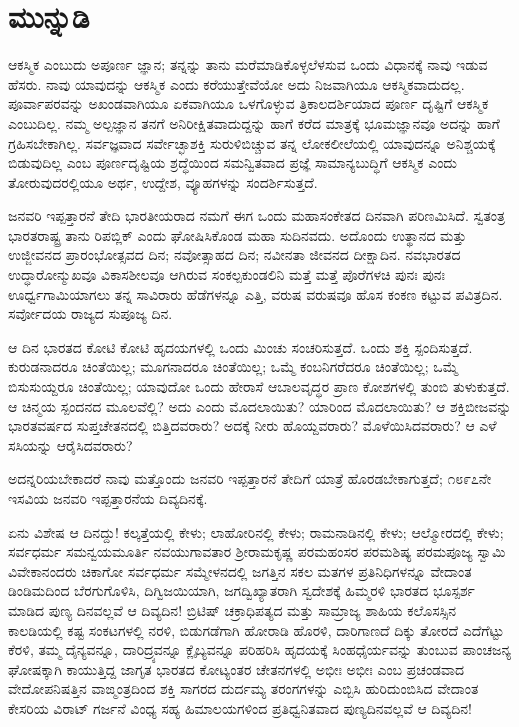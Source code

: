 
\chapter*{ಮುನ್ನುಡಿ}

ಆಕಸ್ಮಿಕ ಎಂಬುದು ಅಪೂರ್ಣ ಜ್ಞಾನ; ತನ್ನನ್ನು ತಾನು ಮರೆಮಾಡಿಕೊಳ್ಳಲೆಳಸುವ ಒಂದು ವಿಧಾನಕ್ಕೆ ನಾವು ಇಡುವ ಹೆಸರು. ನಾವು ಯಾವುದನ್ನು ಆಕಸ್ಮಿಕ ಎಂದು ಕರೆಯುತ್ತೇವೆಯೋ ಅದು ನಿಜವಾಗಿಯೂ ಆಕಸ್ಮಿಕವಾದುದಲ್ಲ. ಪೂರ್ವಾಪರವನ್ನು ಅಖಂಡವಾಗಿಯೂ ಏಕವಾಗಿಯೂ ಒಳಗೊಳ್ಳುವ ತ್ರಿಕಾಲದರ್ಶಿಯಾದ ಪೂರ್ಣ ದೃಷ್ಟಿಗೆ ಆಕಸ್ಮಿಕ ಎಂಬುದಿಲ್ಲ. ನಮ್ಮ ಅಲ್ಪಜ್ಞಾನ ತನಗೆ ಅನಿರೀಕ್ಷಿತವಾದುದ್ದನ್ನು ಹಾಗೆ ಕರೆದ ಮಾತ್ರಕ್ಕೆ ಭೂಮಜ್ಞಾನವೂ ಅದನ್ನು ಹಾಗೆ ಗ್ರಹಿಸಬೇಕಾಗಿಲ್ಲ. ಸರ್ವಜ್ಞವಾದ ಸರ್ವೇಚ್ಛಾಶಕ್ತಿ ಸುರುಳಿಬಿಚ್ಚುವ ತನ್ನ ಲೋಕಲೀಲೆಯಲ್ಲಿ ಯಾವುದನ್ನೂ ಅನಿಶ್ಚಯಕ್ಕೆ ಬಿಡುವುದಿಲ್ಲ ಎಂಬ ಪೂರ್ಣದೃಷ್ಟಿಯ ಶ್ರದ್ಧೆಯಿಂದ ಸಮನ್ವಿತವಾದ ಪ್ರಜ್ಞೆ ಸಾಮಾನ್ಯಬುದ್ಧಿಗೆ ಆಕಸ್ಮಿಕ ಎಂದು ತೋರುವುದರಲ್ಲಿಯೂ ಅರ್ಥ, ಉದ್ದೇಶ, ವ್ಯೂಹಗಳನ್ನು ಸಂದರ್ಶಿಸುತ್ತದೆ. 

ಜನವರಿ ಇಪ್ಪತ್ತಾರನೆ ತೇದಿ ಭಾರತೀಯರಾದ ನಮಗೆ ಈಗ ಒಂದು ಮಹಾಸಂಕೇತದ ದಿನವಾಗಿ ಪರಿಣಮಿಸಿದೆ. ಸ್ವತಂತ್ರ ಭಾರತರಾಷ್ಟ್ರ ತಾನು ರಿಪಬ್ಲಿಕ್​ ಎಂದು ಘೋಷಿಸಿಕೊಂಡ ಮಹಾ ಸುದಿನವದು. ಅದೊಂದು ಉತ್ಥಾನದ ಮತ್ತು ಉಜ್ಜೀವನದ ಪ್ರಾರಂಭೋತ್ಸವದ ದಿನ; ನವೋತ್ಸಾಹದ ದಿನ; ನವೀನತಾ ಜೀವನದ ದೀಕ್ಷಾದಿನ. ನವಭಾರತದ ಉದ್ಧಾರೋನ್ಮುಖವೂ ವಿಕಾಸಶೀಲವೂ ಆಗಿರುವ ಸಂಕಲ್ಪಕುಂಡಲಿನಿ ಮತ್ತೆ ಮತ್ತೆ ಪೊರೆಗಳಚಿ ಪುನಃ ಪುನಃ ಊರ್ಧ್ವಗಾಮಿಯಾಗಲು ತನ್ನ ಸಾವಿರಾರು ಹೆಡೆಗಳನ್ನೂ ಎತ್ತಿ, ವರುಷ ವರುಷವೂ ಹೊಸ ಕಂಕಣ ಕಟ್ಟುವ ಪವಿತ್ರದಿನ. ಸರ್ವೋದಯ ರಾಜ್ಯದ ಸುಪೂಜ್ಯ ದಿನ. 

ಆ ದಿನ ಭಾರತದ ಕೋಟಿ ಕೋಟಿ ಹೃದಯಗಳಲ್ಲಿ ಒಂದು ಮಿಂಚು ಸಂಚರಿಸುತ್ತದೆ. ಒಂದು ಶಕ್ತಿ ಸ್ಪಂದಿಸುತ್ತದೆ. ಕುರುಡನಾದರೂ ಚಿಂತೆಯಿಲ್ಲ; ಮೂಗನಾದರೂ ಚಿಂತೆಯಿಲ್ಲ; ಒಮ್ಮೆ ಕಂಬನಿಗರೆದರೂ ಚಿಂತೆಯಿಲ್ಲ; ಒಮ್ಮೆ ಬಿಸುಸುಯ್ದರೂ ಚಿಂತೆಯಿಲ್ಲ; ಯಾವುದೋ ಒಂದು ಹೇರಾಸೆ ಆಬಾಲವೃದ್ಧರ ಪ್ರಾಣ ಕೋಶಗಳಲ್ಲಿ ತುಂಬಿ ತುಳುಕುತ್ತದೆ. ಆ ಚಿನ್ಮಯ ಸ್ಪಂದನದ ಮೂಲವೆಲ್ಲಿ? ಅದು ಎಂದು ಮೊದಲಾಯಿತು? ಯಾರಿಂದ ಮೊದಲಾಯಿತು? ಆ ಶಕ್ತಿಬೀಜವನ್ನು ಭಾರತವರ್ಷದ ಸುಪ್ತಚೇತನದಲ್ಲಿ ಬಿತ್ತಿದವರಾರು? ಅದಕ್ಕೆ ನೀರು ಹೊಯ್ದವರಾರು? ಮೊಳೆಯಿಸಿದವರಾರು? ಆ ಎಳೆ ಸಸಿಯನ್ನು ಆರೈಸಿದವರಾರು?

ಅದನ್ನರಿಯಬೇಕಾದರೆ ನಾವು ಮತ್ತೊಂದು ಜನವರಿ ಇಪ್ಪತ್ತಾರನೆ ತೇದಿಗೆ ಯಾತ್ರೆ ಹೊರಡಬೇಕಾಗುತ್ತದೆ; ೧೮೯೭ನೇ ಇಸವಿಯ ಜನವರಿ ಇಪ್ಪತ್ತಾರನೆಯ ದಿವ್ಯದಿನಕ್ಕೆ. 

ಏನು ವಿಶೇಷ ಆ ದಿನದ್ದು! ಕಲ್ಕತ್ತೆಯಲ್ಲಿ ಕೇಳು; ಲಾಹೋರಿನಲ್ಲಿ ಕೇಳು; ರಾಮನಾಡಿನಲ್ಲಿ ಕೇಳು; ಆಲ್ಮೋರದಲ್ಲಿ ಕೇಳು; ಸರ್ವಧರ್ಮ ಸಮನ್ವಯಮೂರ್ತಿ ನವಯುಗಾವತಾರ ಶ‍್ರೀರಾಮಕೃಷ್ಣ ಪರಮಹಂಸರ ಪರಮಶಿಷ್ಯ ಪರಮಪೂಜ್ಯ ಸ್ವಾಮಿ ವಿವೇಕಾನಂದರು ಚಿಕಾಗೋ ಸರ್ವಧರ್ಮ ಸಮ್ಮೇಳನದಲ್ಲಿ ಜಗತ್ತಿನ ಸಕಲ ಮತಗಳ ಪ್ರತಿನಿಧಿಗಳನ್ನೂ ವೇದಾಂತ ಡಿಂಡಿಮದಿಂದ ಬೆರಗುಗೊಳಿಸಿ, ದಿಗ್ವಿಜಯಿಯಾಗಿ, ಜಗದ್ವಿಖ್ಯಾತರಾಗಿ ಸ್ವದೇಶಕ್ಕೆ ಹಿಮ್ಮರಳಿ ಭಾರತದ ಭೂಸ್ಪರ್ಶ ಮಾಡಿದ ಪುಣ್ಯ ದಿನವಲ್ಲವೆ ಆ ದಿವ್ಯದಿನ! ಬ್ರಿಟಿಷ್​ ಚಕ್ರಾಧಿಪತ್ಯದ ಮತ್ತು ಸಾಮ್ರಾಜ್ಯ ಶಾಹಿಯ ಕಲೊಸಸ್ಸಿನ ಕಾಲಡಿಯಲ್ಲಿ ಕಷ್ಟ ಸಂಕಟಗಳಲ್ಲಿ ನರಳಿ, ಬಿಡುಗಡೆಗಾಗಿ ಹೋರಾಡಿ ಹೊರಳಿ, ದಾರಿಗಾಣದೆ ದಿಕ್ಕು ತೋರದೆ ಎದೆಗೆಟ್ಟು ಕೆರಳಿ, ತಮ್ಮ ದೈನ್ಯವನ್ನೂ, ದಾರಿದ್ರ್ಯವನ್ನೂ ಕ್ಲೈಬ್ಯವನ್ನೂ ಪರಿಹರಿಸಿ ಹೃದಯಕ್ಕೆ ಸಿಂಹಧೈರ್ಯವನ್ನು ತುಂಬುವ ಪಾಂಚಜನ್ಯ ಘೋಷಕ್ಕಾಗಿ ಕಾಯುತ್ತಿದ್ದ ಜಾಗೃತ ಭಾರತದ ಕೋಟ್ಯಂತರ ಚೇತನಗಳಲ್ಲಿ ಅಭೀಃ ಅಭೀಃ ಎಂಬ ಪ್ರಚಂಡವಾದ ವೇದೋಪನಿಷತ್ತಿನ ವಾಙ್ಮಂತ್ರದಿಂದ ಶಕ್ತಿ ಸಾಗರದ ದುರ್ದಮ್ಯ ತರಂಗಗಳನ್ನು ಎಬ್ಬಿಸಿ ಹುರಿದುಂಬಿಸಿದ ವೇದಾಂತ ಕೇಸರಿಯ ವಿರಾಟ್​ ಗರ್ಜನೆ ವಿಂಧ್ಯ ಸಹ್ಯ ಹಿಮಾಲಯಗಳಿಂದ ಪ್ರತಿಧ್ವನಿತವಾದ ಪುಣ್ಯದಿನವಲ್ಲವೆ ಆ ದಿವ್ಯದಿನ!

